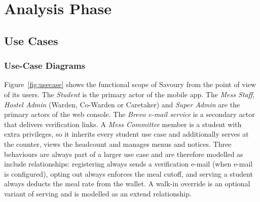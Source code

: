\documentclass[11pt,a4paper]{article}
\begin{document}
\clearpage
\section{Analysis Phase}
\subsection{Use Cases}
\subsubsection{Use-Case Diagrams}

Figure~\ref{fig:usecase} shows the functional scope of Savoury from the point
of view of its users. The \emph{Student} is the primary actor of the mobile app.
The \emph{Mess Staff}, \emph{Hostel Admin} (Warden, Co-Warden or Caretaker) and
\emph{Super Admin} are the primary actors of the web console. The
\emph{Brevo e-mail service} is a secondary actor that delivers verification
links. A \emph{Mess Committee} member is a student with extra privileges, so it
inherits every student use case and additionally serves at the counter, views
the headcount and manages menus and notices. Three behaviours are always part of
a larger use case and are therefore modelled as \guillemotleft include\guillemotright{}
relationships: registering always sends a verification e-mail (when e-mail is
configured), opting out always enforces the meal cutoff, and serving a student
always deducts the meal rate from the wallet. A walk-in override is an optional
variant of serving and is modelled as an \guillemotleft extend\guillemotright{}
relationship.
\end{document}

